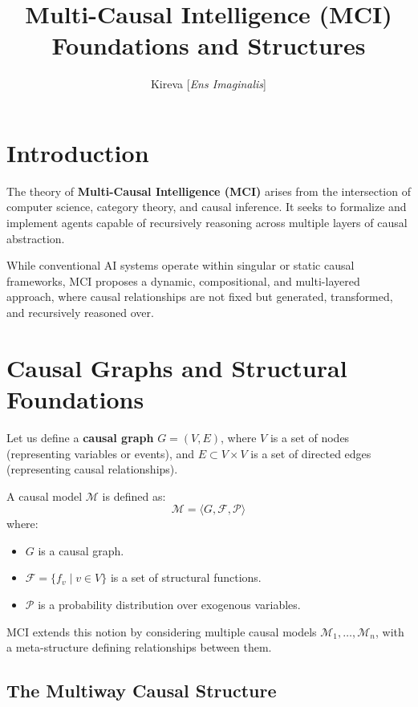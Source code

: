 \documentclass[10pt]{article}
\title{\textbf{Multi-Causal Intelligence (MCI)}\\\large Foundations and Structures}
\author{Kireva [\emph{Ens Imaginalis}]}
\date{}
\begin{document}
\maketitle

\section{Introduction}

The theory of \textbf{Multi-Causal Intelligence (MCI)} arises from the
intersection of computer science, category theory, and causal inference. It
seeks to formalize and implement agents capable of recursively reasoning across
multiple layers of causal abstraction.

While conventional AI systems operate within singular or static causal
frameworks, MCI proposes a dynamic, compositional, and multi-layered approach,
where causal relationships are not fixed but generated, transformed, and
recursively reasoned over.

\section{Causal Graphs and Structural Foundations}
\label{sec:causal-graphs-structural-foundations}

Let us define a \textbf{causal graph} \( G = (V, E) \), where \( V \) is a set
of nodes (representing variables or events), and \( E \subset V \times V \) is
a set of directed edges (representing causal relationships).

A causal model \( \mathcal{M} \) is defined as:
\[
\mathcal{M} = \langle G, \mathcal{F}, \mathcal{P} \rangle
\]
where:
\begin{itemize}
    \item \( G \) is a causal graph.
    \item \( \mathcal{F} = \{ f_v \mid v \in V \} \) is a set of structural functions.
    \item \( \mathcal{P} \) is a probability distribution over exogenous variables.
\end{itemize}

MCI extends this notion by considering multiple causal models \( \mathcal{M}_1,
\dots, \mathcal{M}_n \), with a meta-structure defining relationships between
them.

\subsection{The Multiway Causal Structure}
\end{document}
